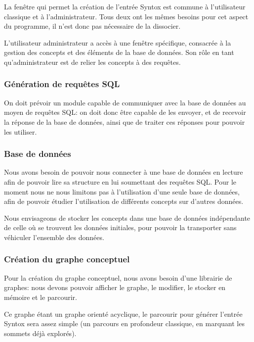 \documentclass[12pt]{report}
\begin{document}
La fenêtre qui permet la création de l'entrée Syntox est commune à l'utilisateur classique et à l'administrateur. Tous deux ont les mêmes besoins pour cet aspect du programme, il n'est donc pas nécessaire de la dissocier.

\bigskip

L'utilisateur administrateur a accès à une fenêtre spécifique, consacrée à la gestion des concepts et des éléments de la base de données. Son rôle en tant qu'administrateur est de relier les concepts à des requêtes.

\subsubsection{Génération de requêtes SQL}

On doit prévoir un module capable de communiquer avec la base de données au moyen de requêtes SQL: on doit donc être capable de les envoyer, et de recevoir la réponse de la base de données, ainsi que de traiter ces réponses pour pouvoir les utiliser.

\subsubsection{Base de données}

Nous avons besoin de pouvoir nous connecter à une base de données en lecture afin de pouvoir lire sa structure en lui soumettant des requêtes SQL. Pour le moment nous ne nous limitons pas à l'utilisation d'une seule base de données, afin de pouvoir étudier l'utilisation de différents concepts sur d'autres données.

Nous envisageons de stocker les concepts dans une base de données indépendante de celle où se trouvent les données initiales, pour pouvoir la transporter sans véhiculer l'ensemble des données.

\subsubsection{Création du graphe conceptuel}

Pour la création du graphe conceptuel, nous avons besoin d'une librairie de graphes:
nous devons pouvoir afficher le graphe, le modifier, le stocker en mémoire et le parcourir.

Ce graphe étant un graphe orienté acyclique, le parcourir pour générer l'entrée Syntox sera assez simple (un parcours en profondeur classique, en marquant les sommets déjà explorés).
  
\end{document}
